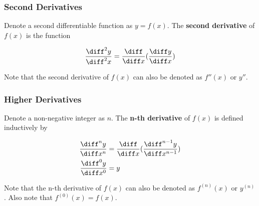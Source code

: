 \subsubsection{Second Derivatives}
\begin{dft}
  Denote a second differentiable function as $y=f(x)$. The \textbf{second derivative} of $f(x)$ is the function

  $$\frac{\diff ^2 y}{\diff ^2 x}=\frac{\diff }{\diff  x}(\frac{\diff  y}{\diff  x})$$
\end{dft}\n

Note that the second derivative of $f(x)$ can also be denoted as $f''(x)$ or $y''$.

\subsubsection{Higher Derivatives}
\begin{dft}
  Denote a non-negative integer as $n$. The \textbf{n-th derivative} of $f(x)$ is defined inductively by

  $$\begin{aligned}[t]
    \frac{\diff ^{n} y}{\diff  x^{n}}&=\frac{\diff }{\diff  x}(\frac{\diff ^{n-1} y}{\diff  x^{n-1}})\\
    \frac{\diff ^{0} y}{\diff  x^{0}}&=y
  \end{aligned}$$
\end{dft}\n

Note that the n-th derivative of $f(x)$ can also be denoted as $f^{(n)}(x)$ or $y^{(n)}$. Also note that $f^{(0)}(x)=f(x)$.

